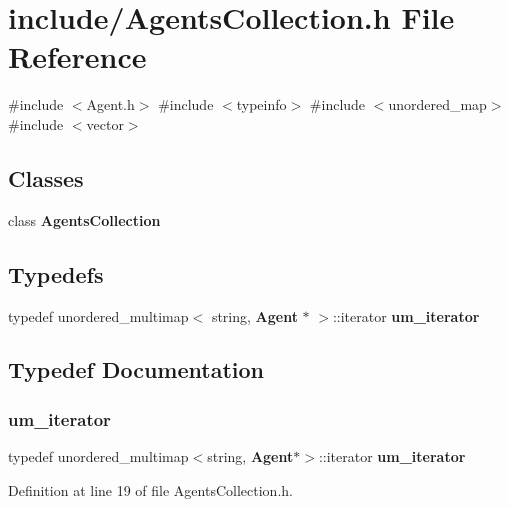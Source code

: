 \section{include/\+Agents\+Collection.h File Reference}
\label{_agents_collection_8h}
{\ttfamily \#include $<$Agent.\+h$>$}\newline
{\ttfamily \#include $<$typeinfo$>$}\newline
{\ttfamily \#include $<$unordered\+\_\+map$>$}\newline
{\ttfamily \#include $<$vector$>$}\newline
\subsection*{Classes}
\begin{DoxyCompactItemize}
\item 
class \textbf{ Agents\+Collection}
\end{DoxyCompactItemize}
\subsection*{Typedefs}
\begin{DoxyCompactItemize}
\item 
typedef unordered\+\_\+multimap$<$ string, \textbf{ Agent} $\ast$ $>$\+::iterator \textbf{ um\+\_\+iterator}
\end{DoxyCompactItemize}


\subsection{Typedef Documentation}
\mbox{\label{_agents_collection_8h_afde47bc45d604b8b8c72755072376679}} 
\subsubsection{um\_iterator}
{\footnotesize\ttfamily typedef unordered\+\_\+multimap$<$string, \textbf{ Agent}$\ast$$>$\+::iterator \textbf{ um\+\_\+iterator}}



Definition at line 19 of file Agents\+Collection.\+h.

